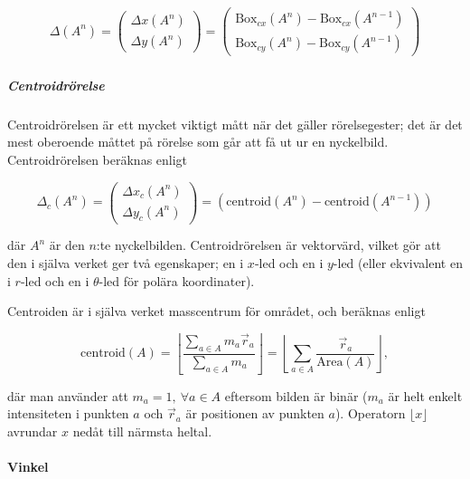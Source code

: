 \documentclass[../rapport_MVEX01-11-05]{subfiles}
\begin{document}
\begin{gather*}
  \Delta (A^n) =
  \begin{pmatrix}
    \Delta x(A^n)\\[3pt]
    \Delta y(A^n)
  \end{pmatrix}
  =
  \begin{pmatrix}
    \textrm{Box}_{cx}(A^n) - \textrm{Box}_{cx}(A^{n-1})\\[3pt]
    \textrm{Box}_{cy}(A^n) - \textrm{Box}_{cy}(A^{n-1})
  \end{pmatrix}
\end{gather*}

\subparagraph{Centroidrörelse}

Centroidrörelsen är ett mycket viktigt mått när det gäller
rörelsegester; det är det mest oberoende måttet på rörelse som går att
få ut ur en nyckelbild. Centroidrörelsen beräknas enligt

\begin{equation*}
  \Delta_c(A^n) = 
  \begin{pmatrix}
    \Delta x_c(A^n) \\[3pt]
    \Delta y_c(A^n)
   \end{pmatrix}
   = \left(\textrm{centroid}(A^n)-\textrm{centroid}(A^{n-1})\right)
\end{equation*}

där $A^n$ är den $n$:te nyckelbilden. Centroidrörelsen är
vektorvärd, vilket gör att den i själva
verket ger två egenskaper; en i $x$-led och en i $y$-led (eller
ekvivalent en i $r$-led och en i $\theta$-led för polära
koordinater).

Centroiden är i själva verket masscentrum för området, och
beräknas enligt

\begin{equation*}
  \textrm{centroid}(A) = \left\lfloor\frac{
    \sum\limits_{a\in A}m_a\vec{r}_a
  }{
    \sum\limits_{a\in A}m_a
  }\right\rfloor =
  \left\lfloor\sum\limits_{a\in
  A}\frac{\vec{r}_a}{\textrm{Area}(A)}\right\rfloor,
\end{equation*}

där man använder att $m_a=1,\:\forall a\in A$ eftersom bilden är
binär ($m_a$ är helt enkelt intensiteten i punkten $a$ och
$\vec{r}_a$ är positionen av punkten $a$). Operatorn $\lfloor
x\rfloor$ avrundar $x$ nedåt till närmsta heltal.

\paragraph{Vinkel}
\label{sss:vinkel}
\end{document}
